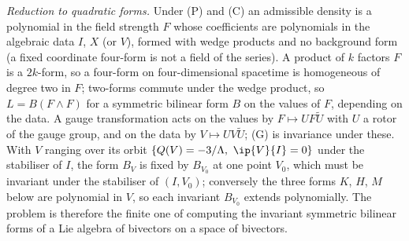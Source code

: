 \emph{Reduction to quadratic forms.} Under (P) and (C) an admissible density is a polynomial in the field strength $F$ whose coefficients are polynomials in the algebraic data $I$, $X$ (or $V$), formed with wedge products and no background form (a fixed coordinate four-form is not a field of the series). A product of $k$ factors $F$ is a $2k$-form, so a four-form on four-dimensional spacetime is homogeneous of degree two in $F$; two-forms commute under the wedge product, so $L = B(F \wedge F)$ for a symmetric bilinear form $B$ on the values of $F$, depending on the data. A gauge transformation acts on the values by $F \mapsto UF\tilde{U}$ with $U$ a rotor of the gauge group, and on the data by $V \mapsto UV\tilde{U}$; (G) is invariance under these. With $V$ ranging over its orbit $\{Q(V) = -3/\Lambda,\ \ip{V}{I} = 0\}$ under the stabiliser of $I$, the form $B_{V}$ is fixed by $B_{V_{0}}$ at one point $V_{0}$, which must be invariant under the stabiliser of $(I, V_{0})$; conversely the three forms $K$, $H$, $M$ below are polynomial in $V$, so each invariant $B_{V_{0}}$ extends polynomially. The problem is therefore the finite one of computing the invariant symmetric bilinear forms of a Lie algebra of bivectors on a space of bivectors.

